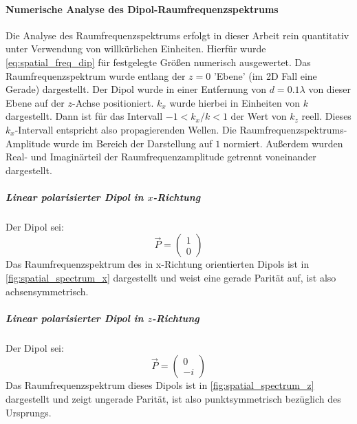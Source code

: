 \documentclass[titlepage,  ngerman]{article}
\begin{document}
	\paragraph{Numerische Analyse des Dipol-Raumfrequenzspektrums}
	Die Analyse des Raumfrequenzspektrums erfolgt in dieser Arbeit rein quantitativ unter Verwendung von willkürlichen Einheiten. Hierfür wurde \eqref{eq:spatial_freq_dip} für festgelegte Größen numerisch ausgewertet.
	Das Raumfrequenzspektrum wurde entlang der $z = 0$ 'Ebene' (im 2D Fall eine Gerade) dargestellt. Der Dipol wurde in einer Entfernung von $d = 0.1 \lambda$  von dieser Ebene auf der $z$-Achse positioniert. $k_x$ wurde hierbei in Einheiten von $k$ dargestellt. Dann ist für das Intervall $-1 < k_x / k <1$ der Wert von $k_z$ reell. Dieses $k_x$-Intervall entspricht also propagierenden Wellen. Die Raumfrequenzspektrums-Amplitude wurde im Bereich der Darstellung auf $1$ normiert. Außerdem wurden Real- und Imaginärteil der Raumfrequenzamplitude getrennt voneinander dargestellt.
	\subparagraph{Linear polarisierter Dipol in $x$-Richtung}
	Der Dipol sei:
	$$\vec{P} = \begin{pmatrix} 1 \\ 0\end{pmatrix}$$
	Das Raumfrequenzspektrum des in x-Richtung orientierten Dipols ist in \ref{fig:spatial_spectrum_x} dargestellt und weist eine gerade Parität auf, ist also achsensymmetrisch.	
	\subparagraph{Linear polarisierter Dipol in $z$-Richtung}
	Der Dipol sei:
	$$\vec{P} = \begin{pmatrix} 0 \\ -i\end{pmatrix}$$
	Das Raumfrequenzspektrum dieses Dipols ist in \ref{fig:spatial_spectrum_z} dargestellt und zeigt ungerade Parität, ist also punktsymmetrisch bezüglich des Ursprungs.
\end{document}
